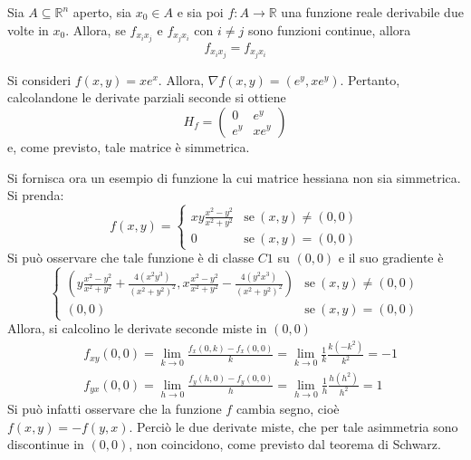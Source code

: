 \begin{theorem} \label{Teo: Schwarz}
    Sia $A \subseteq \mathbb{R}^n$ aperto, sia $x_0 \in A$ e sia poi $f: A \to \mathbb{R}$ una funzione reale derivabile due volte in $x_0$. Allora, se $f_{x_ix_j}$ e $f_{x_jx_i}$ con $i \neq j$ sono funzioni continue, allora 
    \begin{equation}
        f_{x_ix_j}=f_{x_jx_i}
    \end{equation}
    \begin{example}
        Si consideri $f(x, y)=x e^x$. Allora, $\nabla f(x,y)=(e^y, xe^y)$.
        Pertanto, calcolandone le derivate parziali seconde si ottiene
        \begin{equation*}
            H_f=\begin{pmatrix}
                0 &e^y\\
                e^y &xe^y
            \end{pmatrix}
        \end{equation*}
        e, come previsto, tale matrice è simmetrica.
    \end{example}
    \begin{example}
        Si fornisca ora un esempio di funzione la cui matrice hessiana non sia simmetrica.\\
        Si prenda:
        \begin{equation*}
            f(x,y)=\begin{cases}
                xy \frac{x^2-y^2}{x^2+y^2} &\text{se}\ (x,y)\neq (0,0)\\
                0 &\text{se}\ (x,y)=(0,0)
            \end{cases}
        \end{equation*}
        Si può osservare che tale funzione è di classe $C1$ su $(0,0)$ e il suo gradiente è
        \begin{equation*}
            \begin{cases}
                \left(y \frac{x^2-y^2}{x^2+y^2}+\frac{4(x^2y^3)}{(x^2+y^2)^2},x \frac{x^2-y^2}{x^2+y^2}-\frac{4(y^2x^3)}{(x^2+y^2)^2}\right) &\text{se}\ (x,y)\neq(0,0)\\
                (0,0) &\text{se}\ (x,y)=(0,0)
            \end{cases}
        \end{equation*}
        Allora, si calcolino le derivate seconde miste in $(0,0)$
        \begin{equation*}
            \begin{aligned}
                &f_{xy}(0,0)=\lim_{k \to 0}\frac{f_x(0,k)-f_x(0,0)}{k}= \lim_{k\to 0}{\frac{1}{k} \frac{k(-k^2)}{k^2}}=-1\\
                &f_{yx}(0,0)=\lim_{h \to 0} \frac{f_y(h,0)-f_y(0,0)}{h}=\lim_{h \to 0}{\frac{1}{h} \frac{h(h^2)}{h^2}}=1
            \end{aligned}
        \end{equation*}
        Si può infatti osservare che la funzione $f$ cambia segno, cioè $f(x,y)=-f(y,x)$. Perciò le due derivate miste, che per tale asimmetria sono discontinue in $(0,0)$, non coincidono, come previsto dal teorema di Schwarz.
    \end{example}
\end{theorem}
